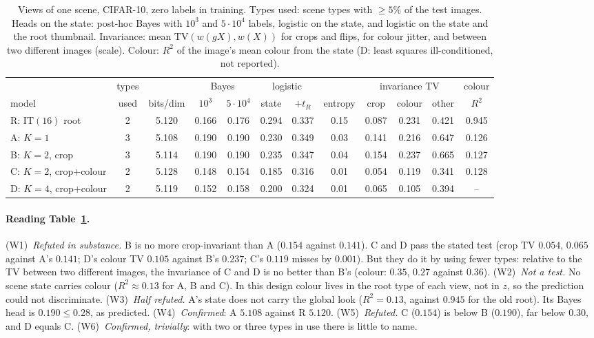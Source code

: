 \documentclass[11pt]{article}
\theoremstyle{definition}
\begin{document}
\begin{table}[h]\centering
\caption{Views of one scene, CIFAR-10, zero labels in training. Types used: scene types with $\ge5\%$ of the test images.
Heads on the state: post-hoc Bayes with $10^3$ and $5\cdot10^4$ labels, logistic on the state, and logistic on the state
and the root thumbnail. Invariance: mean $\mathrm{TV}(w(gX),w(X))$ for crops and flips, for colour jitter, and between two
different images (scale). Colour: $R^2$ of the image's mean colour from the state (D: least squares ill-conditioned, not
reported).}\label{tab:views}
\small\begin{tabular}{l|c|c|cc|cc|c|ccc|c}\toprule
& types & & \multicolumn{2}{c|}{Bayes} & \multicolumn{2}{c|}{logistic} & & \multicolumn{3}{c|}{invariance TV} & colour\\
model & used & bits/dim & $10^3$ & $5{\cdot}10^4$ & state & $+t_R$ & entropy & crop & colour & other & $R^2$\\\midrule
R: $\mathrm{IT}(16)$ root & 2 & 5.120 & 0.166 & 0.176 & 0.294 & 0.337 & 0.15 & 0.087 & 0.231 & 0.421 & 0.945\\
A: $K=1$ & 3 & 5.108 & 0.190 & 0.190 & 0.230 & 0.349 & 0.03 & 0.141 & 0.216 & 0.647 & 0.126\\
B: $K=2$, crop & 3 & 5.114 & 0.190 & 0.190 & 0.235 & 0.347 & 0.04 & 0.154 & 0.237 & 0.665 & 0.127\\
C: $K=2$, crop+colour & 2 & 5.128 & 0.148 & 0.154 & 0.185 & 0.316 & 0.01 & 0.054 & 0.119 & 0.341 & 0.128\\
D: $K=4$, crop+colour & 2 & 5.119 & 0.152 & 0.158 & 0.200 & 0.324 & 0.01 & 0.065 & 0.105 & 0.394 & --\\
\bottomrule\end{tabular}
\end{table}

\paragraph{Reading Table~\ref{tab:views}.}
(W1)~\emph{Refuted in substance.} B is no more crop-invariant than A ($0.154$ against $0.141$). C and D pass the stated
test (crop TV $0.054$, $0.065$ against A's $0.141$; D's colour TV $0.105$ against B's $0.237$; C's $0.119$ misses by $0.001$).
But they do it by using fewer types: relative to the TV between two different images, the invariance of C and D is no better
than B's (colour: $0.35$, $0.27$ against $0.36$).
(W2)~\emph{Not a test.} No scene state carries colour ($R^2\approx0.13$ for A, B and C). In this design colour lives in
the root type of each view, not in $z$, so the prediction could not discriminate.
(W3)~\emph{Half refuted.} A's state does not carry the global look ($R^2=0.13$, against $0.945$ for the old root). Its Bayes
head is $0.190\le0.28$, as predicted.
(W4)~\emph{Confirmed}: A $5.108$ against R $5.120$.
(W5)~\emph{Refuted.} C ($0.154$) is below B ($0.190$), far below $0.30$, and D equals C.
(W6)~\emph{Confirmed, trivially}: with two or three types in use there is little to name.
\end{document}
